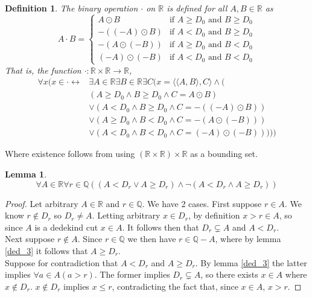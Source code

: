 \documentclass{report}
\newtheorem{lemma}[theo]{Lemma}
\newtheorem{definition}[theo]{Definition}
\begin{document}
\begin{definition}
The binary operation $\cdot$ on $\mathbb R$ is defined for all $A,B\in\mathbb R$ as
\begin{equation*}
A\cdot B=\begin{cases}
A\odot B&\text{if $A\geq D_0$ and $B\geq D_0$}\\
-((-A)\odot B)&\text{if $A<D_0$ and $B\geq D_0$}\\
-(A\odot(-B))&\text{if $A\geq D_0$ and $B<D_0$}\\
(-A)\odot(-B)&\text{if $A<D_0$ and $B<D_0$}
\end{cases}
\end{equation*}
That is, the function $\cdot:\mathbb R\times\mathbb R\to\mathbb R$,
\begin{align*}
\forall x(x\in\cdot\leftrightarrow&\exists A\in\mathbb R\exists B\in\mathbb R\exists C(x=\langle\langle A,B\rangle,C\rangle\land(\\
&(A\geq D_0\land B\geq D_0\land C=A\odot B)\\
&\lor(A<D_0\land B\geq D_0\land C=-((-A)\odot B))\\
&\lor(A\geq D_0\land B<D_0\land C=-(A\odot(-B)))\\
&\lor(A<D_0\land B<D_0\land C=(-A)\odot(-B)))))
\end{align*}
\end{definition}
\noindent Where existence follows from using $(\mathbb R\times\mathbb R)\times\mathbb R$ as a bounding set.
\begin{lemma}\label{ded_4}
\begin{equation*}
\forall A\in\mathbb R\forall r\in\mathbb Q((A<D_r\lor A\geq D_r)\land
\neg(A<D_r\land A\geq D_r))
\end{equation*}
\end{lemma}
\begin{proof}
Let arbitrary $A\in\mathbb R$ and $r\in\mathbb Q$. We have 2 cases. First suppose $r\in A$.
We know $r\notin D_r$ so $D_r\neq A$. Letting arbitrary $x\in D_r$, by definition $x>r\in A$, so 
since $A$ is a dedekind cut $x\in A$. It follows then that $D_r\subsetneq A$ and $A<D_r$.\\
\indent Next suppose $r\notin A$. Since $r\in\mathbb Q$ we then have $r\in\mathbb Q-A$, where by lemma \ref{ded_3} it follows that $A\geq D_r$.\\
\indent Suppose for contradiction that $A<D_r$ and $A\geq D_r$. By lemma \ref{ded_3} the latter implies $\forall a\in A(a>r)$.
The former implies $D_r\subsetneq A$, so there exists $x\in A$ where $x\notin D_r$.
$x\notin D_r$ implies $x\leq r$, contradicting the fact that, since $x\in A$, $x>r$.
\end{proof}
\end{document}
